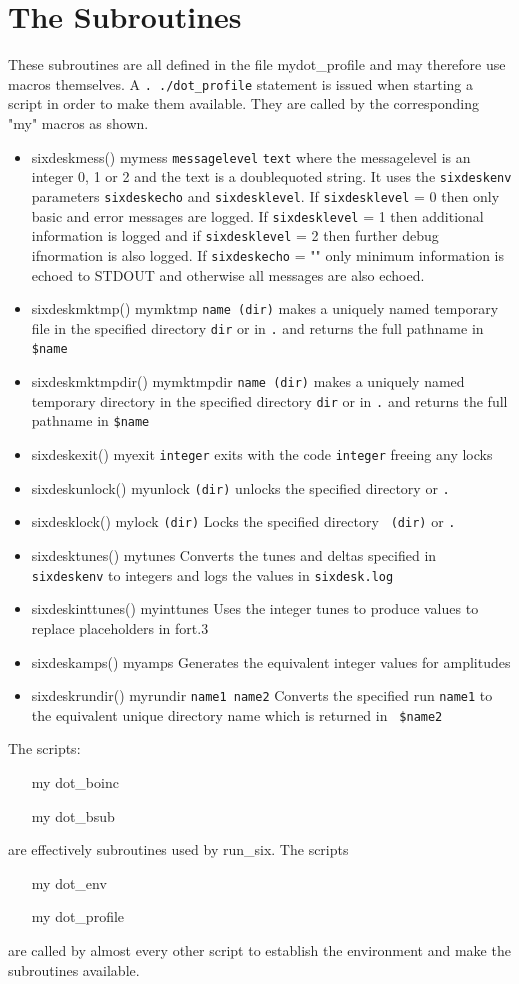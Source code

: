 \documentclass{cernatsnote}
\begin{document}
\section{The Subroutines}
These subroutines are all defined in the file mydot\_profile and may therefore
use macros themselves. A {\tt . ./dot\_profile} statement is issued when
starting a script in order to make them available.  They are called by the
corresponding "my" macros as shown.
\begin{itemize}
\item sixdeskmess() mymess {\tt messagelevel} {\tt text}
where the messagelevel is an integer 0, 1 or 2 and the text is 
a doublequoted string. It uses the {\tt sixdeskenv} parameters 
{\tt sixdeskecho} and {\tt sixdesklevel}. 
If {\tt sixdesklevel} =  0 then only basic and error messages are logged.
If {\tt sixdesklevel} = 1 then additional information is logged and if
{\tt sixdesklevel} = 2 then further debug ifnormation is also logged.
If {\tt sixdeskecho}  = "" only minimum information is echoed to STDOUT
and otherwise all messages are also echoed.
\item sixdeskmktmp() mymktmp {\tt name (dir)} makes a uniquely named temporary
  file in the specified directory {\tt dir} or in {\tt .} and returns the full
  pathname in {\tt \$name} 
\item sixdeskmktmpdir() mymktmpdir {\tt name (dir)} makes a uniquely named
  temporary directory in the specified directory {\tt dir} or in {\tt .} and
  returns the full pathname in {\tt \$name}
\item sixdeskexit() myexit {\tt integer} exits with the code {\tt integer}
  freeing any locks
\item sixdeskunlock() myunlock {\tt (dir)} unlocks the specified directory or
  {\tt .}
\item sixdesklock() mylock {\tt (dir)} Locks the specified directory {\tt
  (dir)} or {\tt .}
\item sixdesktunes() mytunes Converts the tunes and deltas specified in {\tt
  sixdeskenv} to integers and logs the values in {\tt sixdesk.log} 
\item sixdeskinttunes() myinttunes Uses the integer tunes to produce values to
  replace placeholders in fort.3
\item sixdeskamps() myamps Generates the equivalent integer values for
  amplitudes
\item sixdeskrundir() myrundir {\tt name1 name2} Converts the specified run
  {\tt name1} to the equivalent unique directory name which is returned in {\tt
  \$name2}
\end{itemize}
The scripts:
\begin{itemize}
\item [my]dot\_boinc
\item [my]dot\_bsub
\end{itemize}
are effectively subroutines used by run\_six.
The scripts
\begin{itemize}
\item [my]dot\_env
\item [my]dot\_profile
\end{itemize}
are called by almost every other script to establish the environment and make
the subroutines available.
\end{document}
